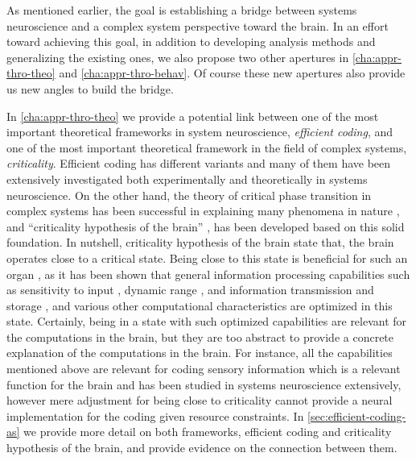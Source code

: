 As mentioned earlier, the goal is establishing a bridge between systems neuroscience and a complex system perspective toward the brain.
In an effort toward achieving this goal,
in addition to developing analysis methods and generalizing the existing ones,
we also propose two other apertures in \autoref{cha:appr-thro-theo} and \autoref{cha:appr-thro-behav}.
Of course these new apertures also provide us new angles to build the bridge.

In \autoref{cha:appr-thro-theo} we provide a potential link between one of the most important theoretical frameworks in system neuroscience, \emph{efficient coding}, 
and one of the most important theoretical framework in the field of complex systems, \emph{criticality}. 
Efficient coding has different variants and many of them have been extensively investigated both experimentally and theoretically in systems neuroscience.
On the other hand, the theory of critical phase transition in complex systems 
has been successful in explaining many phenomena in nature \cite{mathisEmergenceLifeFirstOrder2017a,chialvoLifeEdgeComplexity2018}, 
and ``criticality hypothesis of the brain'' \cite{munozColloquiumCriticalityDynamical2018},
has been developed based on this solid foundation.
In nutshell, criticality hypothesis of the brain state that, the brain operates close to a critical state.
Being close to this state is beneficial for such an organ
\cite{munozColloquiumCriticalityDynamical2018,tkacikInformationProcessingLiving2016,moraAreBiologicalSystems2011a},
as it has been shown that general information processing capabilities such as
sensitivity to input \cite{kinouchiOptimalDynamicalRange2006,brochiniPhaseTransitionsSelforganized2016}, 
dynamic range
\cite{kinouchiOptimalDynamicalRange2006,larremorePredictingCriticalityDynamic2011,nurProbingSpatialInhomogeneity2019},
and information transmission and storage
\cite{shewInformationCapacityTransmission2011,vanniCriticalityTransmissionInformation2011,vanniCriticalityTransmissionInformation2011,lukovicTransmissionInformationCriticality2014,marinazzoInformationTransferCriticality2014},
and various other computational characteristics are optimized in this state.
Certainly, being in a state with such optimized capabilities are relevant for the computations in the brain, 
but they are too abstract to provide a concrete explanation of the computations in the brain.
For instance, all the capabilities mentioned above are relevant for coding sensory information which is a relevant function for the brain and has been studied in systems neuroscience extensively,
however mere adjustment for being close to criticality cannot provide a neural implementation for the coding given resource constraints.
In \autoref{sec:efficient-coding-as} we provide more detail on both frameworks,
efficient coding and criticality hypothesis of the brain,
and provide evidence on the connection between them.

